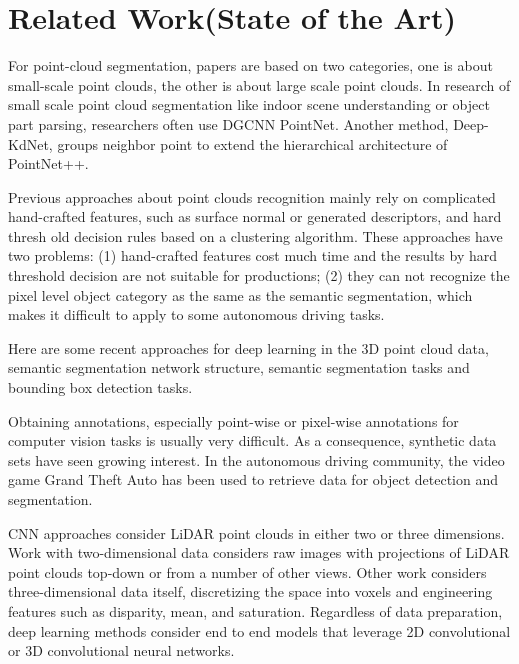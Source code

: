 \documentclass[final]{cvpr}
\begin{document}
\section{Related Work(State of the Art)}
For point-cloud segmentation, papers are based on two categories, one is about small-scale point clouds, the other is about large scale point clouds. In research of small scale point cloud segmentation like indoor scene understanding or object part parsing, researchers often use  DGCNN\cite{50} PointNet\cite{35}\cite{36}. Another method, Deep-KdNet\cite{20}, groups neighbor point to extend the hierarchical architecture of PointNet++\cite{36}.

Previous approaches about point clouds recognition\cite{1}\cite{2} mainly rely on complicated hand-crafted features, such as surface normal or generated descriptors, and hard thresh old decision rules based on a clustering algorithm. These approaches have two problems: (1) hand-crafted features cost much time and the results by hard threshold decision are not suitable for productions; (2) they can not recognize the pixel level object category as the same as the semantic segmentation, which makes it difficult to apply to some autonomous driving tasks\cite{2018PointSeg}.

Here are some recent approaches for deep learning in the 3D point cloud data, semantic segmentation network structure, semantic segmentation tasks and bounding box detection tasks\cite{2018PointSeg}. 

Obtaining annotations, especially point-wise or pixel-wise annotations for computer vision tasks is usually very difficult. As a consequence, synthetic data sets have seen growing interest. In the autonomous driving community, the video game Grand Theft Auto has been used to retrieve data for object detection and segmentation\cite{019}\cite{020}\cite{4}.

CNN\cite{6} approaches consider LiDAR point clouds in either two or three dimensions. Work with two-dimensional data considers raw images with projections of LiDAR point clouds top-down\cite{014} or from a number of other views\cite{015}. Other work considers three-dimensional data itself, discretizing the space into voxels and engineering features such as disparity, mean, and saturation\cite{016}. Regardless of data preparation, deep learning methods consider end to end models that leverage 2D convolutional\cite{017} or 3D convolutional\cite{018} neural networks\cite{4}. 
\end{document}
